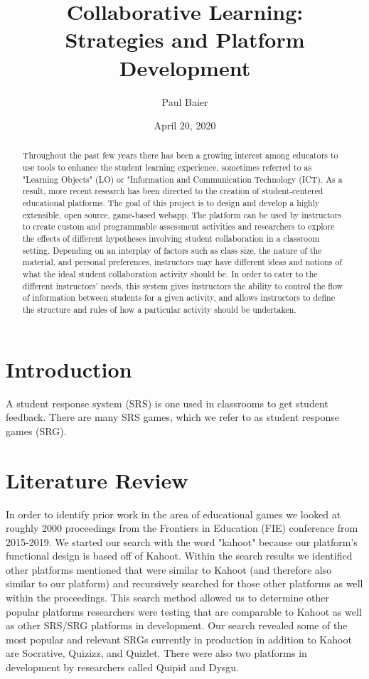 \documentclass{article}
\title{Collaborative Learning: \\
\normalsize Strategies and Platform Development
}
\author{Paul Baier}
\date{April 20, 2020}
\begin{document}
\maketitle

\begin{abstract}
Throughout the past few years there has been a growing interest among educators to use tools to enhance the student learning experience, sometimes referred to as "Learning Objects" (LO) or "Information and Communication Technology (ICT). As a result, more recent research has been directed to the creation of student-centered educational platforms. The goal of this project is to design and develop a highly extensible, open source, game-based webapp. The platform can be used by instructors to create custom and programmable assessment activities and researchers to explore the effects of different hypotheses involving student collaboration in a classroom setting. Depending on an interplay of factors such as class size, the nature of the material, and personal preferences, instructors may have different ideas and notions of what the ideal student collaboration activity should be. In order to cater to the different instructors’ needs, this system gives instructors the ability to control the flow of information between students for a given activity, and allows instructors to define the structure and rules of how a particular activity should be undertaken.
\end{abstract}

\section{Introduction}
A student response system (SRS) is one used in classrooms to get student feedback. There are many SRS games, which we refer to as student response games (SRG).

\section{Literature Review}
In order to identify prior work in the area of educational games we looked at roughly 2000 proceedings from the Frontiers in Education (FIE) conference from 2015-2019. We started our search with the word "kahoot" because our platform's functional design is based off of Kahoot. Within the search results we identified other platforms mentioned that were similar to Kahoot (and therefore also similar to our platform) and recursively searched for those other platforms as well within the proceedings. This search method allowed us to determine other popular platforms researchers were testing that are comparable to Kahoot as well as other SRS/SRG platforms in development. Our search revealed some of the most popular and relevant SRGs currently in production in addition to Kahoot are Socrative\cite{socrative}, Quizizz\cite{quizizz}, and Quizlet\cite{quizlet}. There were also two platforms in development by researchers called Quipid\cite{quipid} and Dysgu\cite{dysgu}.
\end{document}
